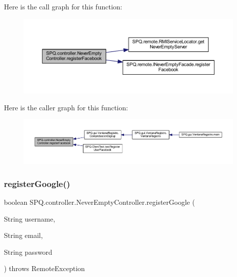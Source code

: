 Here is the call graph for this function\+:\nopagebreak
\begin{figure}[H]
\begin{center}
\leavevmode
\includegraphics[width=350pt]{class_s_p_q_1_1controller_1_1_never_empty_controller_ad766d360d5d5c69d6e6d5b2953b27fac_cgraph}
\end{center}
\end{figure}
Here is the caller graph for this function\+:\nopagebreak
\begin{figure}[H]
\begin{center}
\leavevmode
\includegraphics[width=350pt]{class_s_p_q_1_1controller_1_1_never_empty_controller_ad766d360d5d5c69d6e6d5b2953b27fac_icgraph}
\end{center}
\end{figure}
\mbox{\label{class_s_p_q_1_1controller_1_1_never_empty_controller_a0adc4a1885dcc8ef6fe53bd23ee2316a}} 
\subsubsection{\texorpdfstring{register\+Google()}{registerGoogle()}}
{\footnotesize\ttfamily boolean S\+P\+Q.\+controller.\+Never\+Empty\+Controller.\+register\+Google (\begin{DoxyParamCaption}\item[{String}]{username,  }\item[{String}]{email,  }\item[{String}]{password }\end{DoxyParamCaption}) throws Remote\+Exception}

